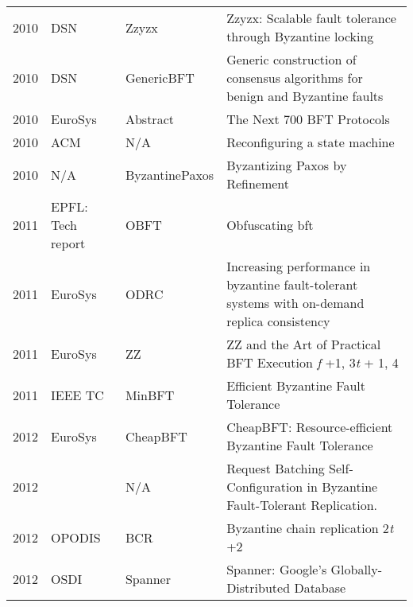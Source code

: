 \documentclass{article}
\begin{document}
\begin{landscape}
\begin{longtable}[c]{llll}
2010 & DSN               & Zzyzx          & Zzyzx: Scalable fault tolerance through Byzantine locking         \cite{5544297}                        \\
2010 & DSN               & GenericBFT     & Generic construction of consensus algorithms for benign and Byzantine faults  \cite{5544299}            \\
2010 & EuroSys           & Abstract       & The Next 700 BFT Protocols                                                                \\
2010 & ACM           & N/A       & Reconfiguring a state machine       \cite{Lamport:2010:RSM:1753171.1753191}                                                           \\
2010 & N/A               & ByzantinePaxos & Byzantizing Paxos by Refinement                                                           \\
2011 & EPFL: Tech report & OBFT           & Obfuscating bft \cite{shokerBFTObfuscatedTR}                                                                          \\
2011 & EuroSys & ODRC          & Increasing performance in byzantine fault-tolerant systems with on-demand replica consistency \cite{Distler:2011:IPB:1966445.1966455}                                                                         \\
2011 & EuroSys           & ZZ             & ZZ and the Art of Practical BFT Execution  \textit{f} +1, 3\textit{t} + 1, 4 \cite{Wood:2011:ZAP:1966445.1966457}                                             \\
2011 & IEEE TC           & MinBFT         & Efficient Byzantine Fault Tolerance         \cite{minbft6081855}                                               \\
2012 & EuroSys           & CheapBFT       & CheapBFT: Resource-efficient Byzantine Fault Tolerance  \cite{cheapbft}                                   \\
2012 &         &  N/A     & Request Batching Self-Configuration in Byzantine Fault-Tolerant Replication.         \cite{6473648}                           \\
2012 & OPODIS            & BCR            & Byzantine chain replication  2\textit{t} +2 \cite{Renesse2012ByzantineCR}                                                             \\
2012 & OSDI            & Spanner           & Spanner: Google’s Globally-Distributed Database \cite{180268}                                                             \\
                                       

\end{longtable}
\end{landscape}
\end{document}
